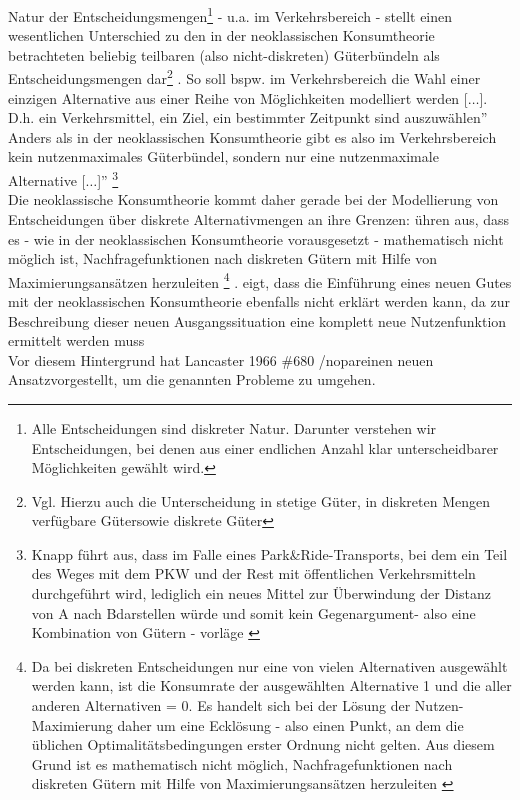  Natur der Entscheidungsmengen\footnote{%
 \glqq Alle Entscheidungen sind diskreter Natur. Darunter verstehen wir Entscheidungen, bei denen aus einer endlichen Anzahl klar unterscheidbarer Möglichkeiten gewählt wird.
}%
 - u.a. im Verkehrsbereich - stellt einen wesentlichen Unterschied zu den in der neoklassischen Konsumtheorie betrachteten beliebig teilbaren (also nicht-diskreten) Güterbündeln als Entscheidungsmengen dar\footnote{%
 Vgl. Hierzu auch die Unterscheidung in \glqq stetige Güter\grqq , \glqq in diskreten Mengen verfügbare Güter\grqq  sowie \glqq diskrete Güter\grqq   \autocites[][]{bib.103}
}%
. So soll bspw. im Verkehrsbereich \glqq die Wahl einer einzigen Alternative aus einer Reihe von Möglichkeiten modelliert werden [$\ldots$]. D.h. ein Verkehrsmittel, ein Ziel, ein bestimmter Zeitpunkt sind auszuwählen”  \autocites[][]{bib.593} Anders als in der neoklassischen Konsumtheorie gibt es also im Verkehrsbereich \glqq kein nutzenmaximales Güterbündel, sondern nur eine nutzenmaximale Alternative [$\ldots$]”  \autocites[][]{bib.593}\footnote{%
 Knapp führt aus, dass im Falle eines Park\&Ride-Transports, bei dem ein Teil des Weges mit dem PKW und der Rest mit öffentlichen Verkehrsmitteln durchgeführt wird, \glqq lediglich ein neues Mittel zur Überwindung der Distanz von A nach B\grqq   darstellen würde und somit \glqq kein Gegenargument\grqq  - also eine Kombination von Gütern - vorläge  \autocites[][]{bib.593}
}%
~\\
Die neoklassische Konsumtheorie kommt daher gerade bei der Modellierung von Entscheidungen über diskrete Alternativmengen an ihre Grenzen:  \citeauthor{bib.325} ühren aus, dass es - wie in der neoklassischen Konsumtheorie vorausgesetzt - mathematisch nicht möglich ist, Nachfragefunktionen nach diskreten Gütern mit Hilfe von Maximierungsansätzen herzuleiten  \autocites[][]{bib.325}\footnote{%
 Da bei diskreten Entscheidungen nur eine von vielen Alternativen ausgewählt werden kann, ist die Konsumrate der ausgewählten Alternative 1 und die aller anderen Alternativen = 0. Es handelt sich bei der Lösung der Nutzen-Maximierung daher um eine Ecklösung - also einen Punkt, an dem die üblichen Optimalitätsbedingungen erster Ordnung nicht gelten. Aus diesem Grund ist es mathematisch nicht möglich, Nachfragefunktionen nach diskreten Gütern mit Hilfe von Maximierungsansätzen herzuleiten  \autocites[][]{bib.325}
}%
.  \citeauthor{bib.680} eigt, dass die Einführung eines neuen Gutes mit der neoklassischen Konsumtheorie ebenfalls nicht erklärt werden kann, da zur Beschreibung dieser neuen Ausgangssituation eine komplett neue Nutzenfunktion ermittelt werden muss  \autocites[][]{bib.680}~\\
Vor diesem Hintergrund hat {Lancaster 1966 \#680 /nopar}einen \glqq neuen Ansatz\grqq  vorgestellt, um die genannten Probleme zu umgehen.~\\


